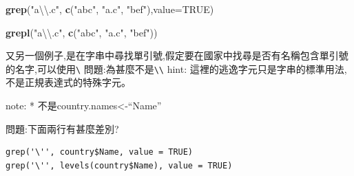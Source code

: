 \documentclass[]{book}
\newenvironment{Shaded}{\begin{snugshade}}{\end{snugshade}}
\newcommand{\CharTok}[1]{\textcolor[rgb]{0.31,0.60,0.02}{#1}}
\newcommand{\DataTypeTok}[1]{\textcolor[rgb]{0.13,0.29,0.53}{#1}}
\newcommand{\KeywordTok}[1]{\textcolor[rgb]{0.13,0.29,0.53}{\textbf{#1}}}
\newcommand{\NormalTok}[1]{#1}
\newcommand{\OperatorTok}[1]{\textcolor[rgb]{0.81,0.36,0.00}{\textbf{#1}}}
\newcommand{\OtherTok}[1]{\textcolor[rgb]{0.56,0.35,0.01}{#1}}
\newcommand{\StringTok}[1]{\textcolor[rgb]{0.31,0.60,0.02}{#1}}
\theoremstyle{definition}
\theoremstyle{definition}
\theoremstyle{definition}
\theoremstyle{remark}
\begin{document}
\begin{Shaded}
\begin{Highlighting}[]
\KeywordTok{grep}\NormalTok{(}\StringTok{"a}\CharTok{\textbackslash{}\textbackslash{}}\StringTok{.c"}\NormalTok{, }\KeywordTok{c}\NormalTok{(}\StringTok{"abc"}\NormalTok{, }\StringTok{"a.c"}\NormalTok{, }\StringTok{"bef"}\NormalTok{),}\DataTypeTok{value=}\OtherTok{TRUE}\NormalTok{)}
\end{Highlighting}
\end{Shaded}

\begin{Shaded}
\begin{Highlighting}[]
\KeywordTok{grepl}\NormalTok{(}\StringTok{"a}\CharTok{\textbackslash{}\textbackslash{}}\StringTok{.c"}\NormalTok{, }\KeywordTok{c}\NormalTok{(}\StringTok{"abc"}\NormalTok{, }\StringTok{"a.c"}\NormalTok{, }\StringTok{"bef"}\NormalTok{))}
\end{Highlighting}
\end{Shaded}

又另一個例子,是在字串中尋找單引號,假定要在國家中找尋是否有名稱包含單引號的名字,可以使用\texttt{\textquotesingle{}\textbackslash{}\textquotesingle{}\textquotesingle{}}
問題:為甚麼不是\texttt{\textquotesingle{}\textbackslash{}\textbackslash{}\textquotesingle{}\textquotesingle{}}
hint:
這裡的逃逸字元只是字串的標準用法,\texttt{\textquotesingle{}}不是正規表達式的特殊字元。

\begin{Shaded}
\end{Shaded}

note: * 不是country.names\textless{}-``Name''

問題:下面兩行有甚麼差別?

\begin{verbatim}
grep('\'', country$Name, value = TRUE)
grep('\'', levels(country$Name), value = TRUE)
\end{verbatim}
\end{document}
